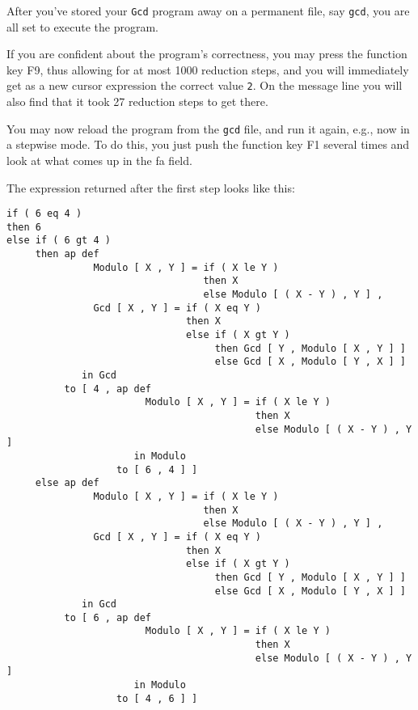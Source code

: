 After you've stored your {\tt Gcd} program away on a permanent file, say {\tt gcd},
 you are all set to execute the program.

 If you are confident about the program's correctness, 
you may press the function key
F9, thus allowing for at most 1000 reduction steps, and you will immediately
get as a new cursor expression the correct value {\tt 2}.  
On the message line you will also
find that it took 27 reduction steps to get there. 

You may now reload the program from the {\tt gcd} file, 
and run it again, e.g.,  now in a stepwise mode.
To do this, you just 
push the function key F1 several times and 
look at what comes up in the {\sc fa} field.

The expression returned after the first step looks like this: 
\begin{verbatim}
if ( 6 eq 4 )
then 6
else if ( 6 gt 4 )
     then ap def 
               Modulo [ X , Y ] = if ( X le Y )
                                  then X
                                  else Modulo [ ( X - Y ) , Y ] ,
               Gcd [ X , Y ] = if ( X eq Y )
                               then X
                               else if ( X gt Y )
                                    then Gcd [ Y , Modulo [ X , Y ] ]
                                    else Gcd [ X , Modulo [ Y , X ] ]
             in Gcd
          to [ 4 , ap def 
                        Modulo [ X , Y ] = if ( X le Y )
                                           then X
                                           else Modulo [ ( X - Y ) , Y ]
                      in Modulo
                   to [ 6 , 4 ] ]
     else ap def 
               Modulo [ X , Y ] = if ( X le Y )
                                  then X
                                  else Modulo [ ( X - Y ) , Y ] ,
               Gcd [ X , Y ] = if ( X eq Y )
                               then X
                               else if ( X gt Y )
                                    then Gcd [ Y , Modulo [ X , Y ] ]
                                    else Gcd [ X , Modulo [ Y , X ] ]
             in Gcd
          to [ 6 , ap def 
                        Modulo [ X , Y ] = if ( X le Y )
                                           then X
                                           else Modulo [ ( X - Y ) , Y ]
                      in Modulo
                   to [ 4 , 6 ] ]

\end{verbatim}

